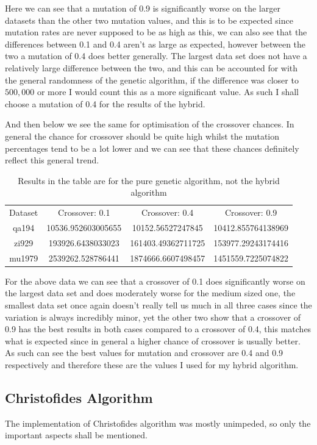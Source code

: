 \documentclass[11pt,a4paper,titlepage]{article}
\begin{document}
Here we can see that a mutation of 0.9 is significantly worse on the larger datasets than the other two mutation values, and this is to be expected since mutation rates are never supposed to be as high as this, we can also see that the differences between 0.1 and 0.4 aren't as large as expected, however between the two a mutation of 0.4 does better generally. The largest data set does not have a relatively large difference between the two, and this can be accounted for with the general randomness of the genetic algorithm, if the difference was closer to $500,000$ or more I would count this as a more significant value. As such I shall choose a mutation of 0.4 for the results of the hybrid.

And then below we see the same for optimisation of the crossover chances. In general the chance for crossover should be quite high whilst the mutation percentages tend to be a lot lower and we can see that these chances definitely reflect this general trend.

\begin{table}[h]
\centering
\begin{tabular}{c | c | c | c}
Dataset & Crossover: 0.1 & Crossover: 0.4 & Crossover: 0.9 \\ [0.5ex]
\Xhline{1.5pt}
	qa194 & 10536.952603005655 & 10152.56527247845 & 10412.855764138969 \\
\hline
	zi929 & 193926.6438033023 & 161403.49362711725 & 153977.29243174416 \\
\hline
	mu1979 & 2539262.528786441 & 1874666.6607498457 & 1451559.7225074822

\end{tabular}
\caption{Results in the table are for the pure genetic algorithm, not the hybrid algorithm}
\end{table}

For the above data we can see that a crossover of 0.1 does significantly worse on the largest data set and does moderately worse for the medium sized one, the smallest data set once again doesn't really tell us much in all three cases since the variation is always incredibly minor, yet the other two show that a crossover of 0.9 has the best results in both cases compared to a crossover of 0.4, this matches what is expected since in general a higher chance of crossover is usually better. As such can see the best values for mutation and crossover are 0.4 and 0.9 respectively and therefore these are the values I used for my hybrid algorithm.

\subsection{Christofides Algorithm}
The implementation of Christofides algorithm was mostly unimpeded, so only the important aspects shall be mentioned.
\end{document}
